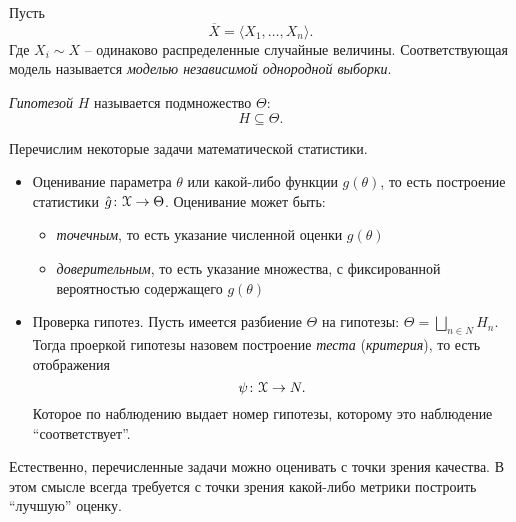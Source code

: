 \begin{definition}
	Пусть
	\[
		\overline{X} = \langle X_1, \ldots, X_n \rangle
	.\]
	Где $X_i \sim X$ -- одинаково распределенные случайные величины.
	Соответствующая модель называется \textit{моделью независимой
	однородной выборки}.
\end{definition}

\begin{definition}
	\textit{Гипотезой} $H$ называется подмножество $\Theta$:
	\[
		H \subseteq \Theta
	.\]
\end{definition}

Перечислим некоторые задачи математической статистики.
\begin{itemize}
	\item Оценивание параметра $\theta$ или какой-либо функции $g(\theta)$,
		то есть построение статистики $\hat{g} \colon \mathcal{X} \to \Theta$.
		Оценивание может быть:
		\begin{itemize}
			\item \textit{точечным}, то есть указание численной оценки
				$g(\theta)$
			\item \textit{доверительным}, то есть указание множества, с
				фиксированной вероятностью содержащего $g(\theta)$
		\end{itemize}
	\item Проверка гипотез. Пусть имеется разбиение $\Theta$ на гипотезы:
		$\Theta = \bigsqcup_{n \in N}{H_n}$. Тогда проеркой гипотезы назовем
		построение \textit{теста} (\textit{критерия}), то есть отображения
		\[
			\psi \colon \mathcal{X} \to N
		.\]
		Которое по наблюдению выдает номер гипотезы, которому это наблюдение
		``соответствует''.
\end{itemize}

Естественно, перечисленные задачи можно оценивать с точки зрения качества.
В этом смысле всегда требуется с точки зрения какой-либо метрики  построить
``лучшую'' оценку.

